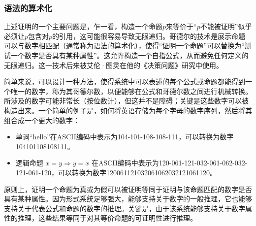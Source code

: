 \subsubsection{语法的算术化}  
上述证明的一个主要问题是，乍一看，构造一个命题\( p \)来等价于“\( p \)不能被证明”似乎必须让\( p \)包含对\( p \)的引用，这可能很容易导致无限递归。哥德尔的技术是展示命题可以与数字相匹配（通常称为语法的算术化），使得“证明一个命题”可以替换为“测试一个数字是否具有某种属性”。这允许构造一个自指公式，从而避免任何定义的无限递归。这一技术后来被艾伦·图灵在他的《决策问题》研究中使用。

简单来说，可以设计一种方法，使得系统中可以表述的每个公式或命题都能得到一个唯一的数字，称为其哥德尔数，以便能够在公式和哥德尔数之间进行机械转换。所涉及的数字可能非常长（按位数计），但这并不是障碍；关键是这些数字可以被构造出来。一个简单的例子是，如何将英语存储为每个字母的数字序列，然后将其组合成一个更大的数字：
\begin{itemize}
\item 单词“hello”在ASCII编码中表示为104-101-108-108-111，可以转换为数字104101108108111。
\item 逻辑命题 \( x = y \Rightarrow y = x \) 在ASCII编码中表示为120-061-121-032-061-062-032-121-061-120，可以转换为数字120061121032061062032121061120。
\end{itemize}
原则上，证明一个命题为真或为假可以被证明等同于证明与该命题匹配的数字是否具有某种属性。因为形式系统足够强大，能够支持关于数字的一般推理，它也能够支持关于代表公式和命题的数字的推理。关键是，由于该系统能够支持关于数字属性的推理，这些结果等同于对其等价命题的可证明性进行推理。